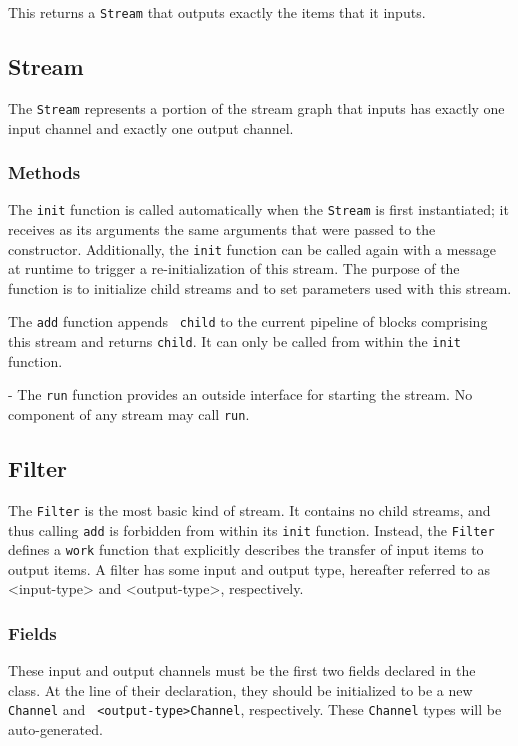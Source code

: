  This returns a {\tt Stream} that outputs
exactly the items that it inputs.

\subsection{Stream}

The {\tt Stream} represents a portion of the stream graph that inputs
has exactly one input channel and exactly one output channel.

\subsubsection{Methods}

  The {\tt init} function is
called automatically when the {\tt Stream} is first instantiated; it
receives as its arguments the same arguments that were passed to the
constructor.  Additionally, the {\tt init} function can be called
again with a message at runtime to trigger a re-initialization of this
stream.  The purpose of the function is to initialize child streams
and to set parameters used with this stream.

  The {\tt add} function appends {\tt
child} to the current pipeline of blocks comprising this stream and
returns {\tt child}.  It can only be called from within the {\tt init}
function.

 - The {\tt run} function provides an outside
interface for starting the stream.  No component of any stream may
call {\tt run}.

\subsection{Filter}

The {\tt Filter} is the most basic kind of stream.  It contains no
child streams, and thus calling {\tt add} is forbidden from within its
{\tt init} function.  Instead, the {\tt Filter} defines a {\tt work}
function that explicitly describes the transfer of input items to
output items.  A filter has some input and output type, hereafter
referred to as <input-type> and <output-type>, respectively.

\subsubsection{Fields} 

These input and output channels must be the first two fields declared
in the class.  At the line of their declaration, they should be
initialized to be a new {\tt <input-type>Channel} and {\tt
<output-type>Channel}, respectively.  These {\tt Channel} types will
be auto-generated.

